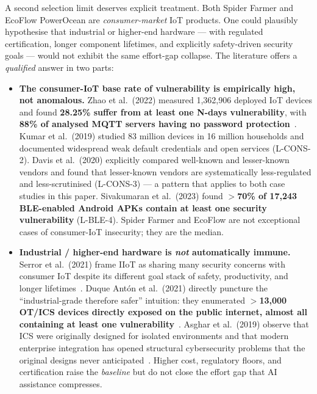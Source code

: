 \documentclass[11pt,a4paper]{article}
\begin{document}
A second selection limit deserves explicit treatment. Both Spider
Farmer and EcoFlow PowerOcean are \emph{consumer-market} IoT products.
One could plausibly hypothesise that industrial or higher-end hardware
--- with regulated certification, longer component lifetimes, and
explicitly safety-driven security goals --- would not exhibit the same
effort-gap collapse. The literature offers a \emph{qualified} answer in
two parts:
\begin{itemize}
  \item \textbf{The consumer-IoT base rate of vulnerability is
        empirically high, not anomalous.} Zhao et al.\ (2022) measured
        1{,}362{,}906 deployed IoT devices and found \textbf{28.25\%
        suffer from at least one N-days vulnerability}, with
        \textbf{88\% of analysed MQTT servers having no password
        protection}~\citep{zhao2022iotbaseline}. Kumar et al.\
        (2019) studied 83 million devices in 16 million households and
        documented widespread weak default credentials and open
        services (L-CONS-2). Davis et al.\ (2020) explicitly compared
        well-known and lesser-known vendors and found that
        lesser-known vendors are systematically less-regulated and
        less-scrutinised (L-CONS-3) --- a pattern that applies to both
        case studies in this paper. Sivakumaran et al.\ (2023) found
        \textbf{$>$70\% of 17{,}243 BLE-enabled Android APKs contain at
        least one security vulnerability} (L-BLE-4). Spider Farmer and
        EcoFlow are not exceptional cases of consumer-IoT insecurity;
        they are the median.
  \item \textbf{Industrial / higher-end hardware is \emph{not}
        automatically immune.} Serror et al.\ (2021) frame IIoT as
        sharing many security concerns with consumer IoT despite its
        different goal stack of safety, productivity, and longer
        lifetimes~\citep{serror2021iiot}. Duque Ant{\'o}n et al.\
        (2021) directly puncture the ``industrial-grade therefore
        safer'' intuition: they enumerated \textbf{$>$13{,}000 OT/ICS
        devices directly exposed on the public internet, almost all
        containing at least one
        vulnerability}~\citep{duqueanton2021ics}. Asghar et al.\
        (2019) observe that ICS were originally designed for isolated
        environments and that modern enterprise integration has opened
        structural cybersecurity problems that the original designs
        never anticipated~\citep{asghar2019ics}. Higher cost, regulatory floors, and
        certification raise the \emph{baseline} but do not close the
        effort gap that AI assistance compresses.
\end{itemize}
\end{document}
